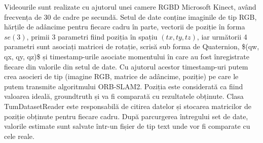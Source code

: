 \documentclass[12pt,a4paper]{report}
\begin{document}
Videourile sunt realizate cu ajutorul unei camere RGBD Microsoft Kinect, având frecvența de
30 de cadre pe secundă. Setul de date conține imaginile de tip RGB, hărțile de adâncime 
pentru fiecare cadru în parte, vectorii de poziție în forma $ se(3) $, primii 3 parametri 
fiind poziția în spațiu $(tx, ty, tz)$, iar următorii 4 parametri sunt asociați matricei 
de rotație, scrisă sub forma de Quaternion, \$(qw, qx, qy, qz)\$ și timestamp-urile 
asociate momentului în care au fost înregistrate fiecare din valorile din setul de date.
Cu ajutorul acestor timestamp-uri putem crea asocieri de tip (imagine RGB, matrice de adâncime,
poziție) pe care le putem transmite algoritmului ORB-SLAM2. Poziția este considerată ca 
fiind valoarea ideală, groundtruth și va fi comparată cu rezultatele obținute. Clasa 
TumDatasetReader este responsabilă de citirea datelor și stocarea matricilor de poziție
obținute pentru fiecare cadru. După parcurgerea întregului set de date, valorile estimate sunt
salvate într-un fișier de tip text unde vor fi comparate cu cele reale.
\end{document}
